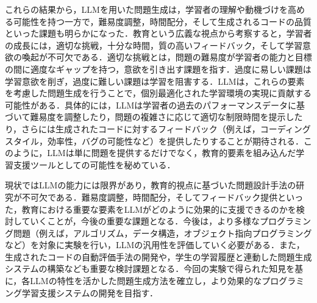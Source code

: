 \documentclass[11pt]{jreport}
\begin{document}
これらの結果から，LLMを用いた問題生成は，学習者の理解や動機づけを高める可能性を持つ一方で，難易度調整，時間配分，そして生成されるコードの品質といった課題も明らかになった．教育という広義な視点から考察すると，学習者の成長には，適切な挑戦，十分な時間，質の高いフィードバック，そして学習意欲の喚起が不可欠である．適切な挑戦とは，問題の難易度が学習者の能力と目標の間に適度なギャップを持つ，意欲を引き出す課題を指す．過度に易しい課題は学習意欲を削ぎ，過度に難しい課題は学習を阻害する．LLMは，これらの要素を考慮した問題生成を行うことで，個別最適化された学習環境の実現に貢献する可能性がある．具体的には，LLMは学習者の過去のパフォーマンスデータに基づいて難易度を調整したり，問題の複雑さに応じて適切な制限時間を提示したり，さらには生成されたコードに対するフィードバック（例えば，コーディングスタイル，効率性，バグの可能性など）を提供したりすることが期待される．このように，LLMは単に問題を提供するだけでなく，教育的要素を組み込んだ学習支援ツールとしての可能性を秘めている．

現状ではLLMの能力には限界があり，教育的視点に基づいた問題設計手法の研究が不可欠である．難易度調整，時間配分，そしてフィードバック提供といった，教育における重要な要素をLLMがどのように効果的に支援できるのかを検討していくことが，今後の重要な課題となる．今後は，より多様なプログラミング問題（例えば，アルゴリズム，データ構造，オブジェクト指向プログラミングなど）を対象に実験を行い，LLMの汎用性を評価していく必要がある．また，生成されたコードの自動評価手法の開発や，学生の学習履歴と連動した問題生成システムの構築なども重要な検討課題となる．今回の実験で得られた知見を基に，各LLMの特性を活かした問題生成方法を確立し，より効果的なプログラミング学習支援システムの開発を目指す．


\end{document}
